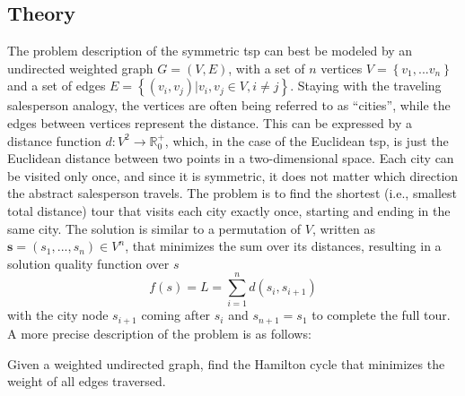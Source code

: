 \subsection{Theory}
\label{chap:tsp-theory}
The problem description of the symmetric \gls{tsp}  can best be modeled by an undirected weighted graph $G = (V,E)$, with a set of $n$ vertices $V = \left\lbrace v_1, ... v_n\right\rbrace $ and a set of edges $E = \left\lbrace (v_i,v_j) | v_i,v_j \in V, i \neq j\right\rbrace $. Staying with the traveling salesperson analogy, the vertices are often being referred to as \enquote{cities}, while the edges between vertices represent the distance. This can be expressed by a distance function $d : V^2 \rightarrow \mathbb{R}_{0}^{+}$, which, in the case of the Euclidean \gls{tsp}, is just the Euclidean distance between two points in a two-dimensional space.  Each city can be visited only once, and since it is symmetric, it does not matter which direction the abstract salesperson travels. The problem is to find the shortest (i.e., smallest total distance) tour that visits each city exactly once, starting and ending in the same city. The solution is similar to a permutation of $V$, written as $\textbf{s} = (s_1,...,s_n) \in V^n$, that minimizes the sum over its distances, resulting in a solution quality function over $s$
\begin{equation}
	\label{eq:solution_quality}
	f(s) = L = \sum_{i=1}^{n} d(s_i,s_{i+1})
\end{equation}
with the city node $s_{i+1}$ coming after $s_i$ and $s_{n+1} = s_1$ to complete the full tour.
A more precise description of the problem is as follows: 


\begin{list}{}{}
	\item 	Given a weighted undirected graph, find the Hamilton cycle that minimizes the weight of all edges traversed.
\end{list}

